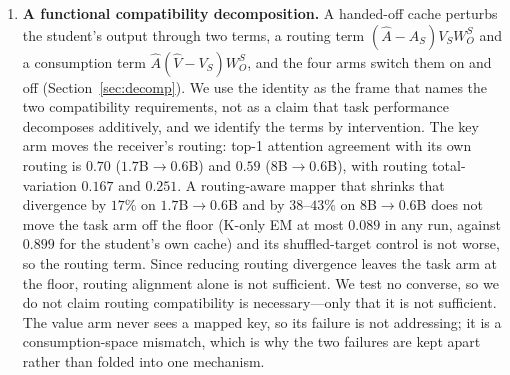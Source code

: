 \documentclass[11pt]{article}
\begin{document}
\begin{enumerate}
\item \textbf{A functional compatibility decomposition.} A handed-off cache
  perturbs the student's output through two terms, a routing term
  $(\hat A-A_S)V_SW_O^S$ and a consumption term $\hat A(\hat V-V_S)W_O^S$, and
  the four arms switch them on and off (Section~\ref{sec:decomp}). We use the
  identity as the frame that names the two compatibility requirements, not as a
  claim that task performance decomposes additively, and we identify the terms
  by intervention. The key arm moves the receiver's routing: top-1 attention
  agreement with its own routing is $0.70$ ($1.7$B$\to0.6$B) and $0.59$
  ($8$B$\to0.6$B), with routing total-variation $0.167$ and $0.251$. A
  routing-aware mapper that shrinks that divergence by $17\%$ on
  $1.7$B$\to0.6$B and by $38$--$43\%$ on $8$B$\to0.6$B does not move the task arm
  off the floor (K-only EM at most $0.089$ in any run, against $0.899$ for the
  student's own cache) and its shuffled-target control is not worse, so the
  routing term. Since reducing routing divergence leaves the task arm at the floor,
  routing alignment alone is not sufficient. We test no converse, so we do not
  claim routing compatibility is necessary---only that it is not sufficient. The
  value arm never sees a mapped
  key, so its failure is not addressing; it is a consumption-space mismatch, which
  is why the two failures are kept apart rather than folded into one mechanism.


\end{enumerate}
\end{document}
